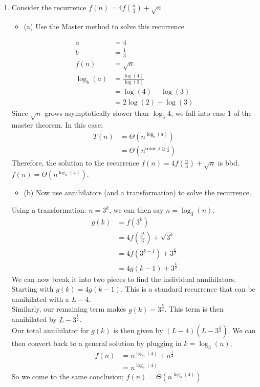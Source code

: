 \documentclass{article}
\begin{document}
\begin{enumerate}
\item Consider the recurrence $f(n) = 4f(\frac{n}{3}) + \sqrt{n}$
\begin{itemize}
    \item (a) Use the Master method to solve this recurrence
\end{itemize}
\begin{align*}
    a & = 4 \\
    b & = \frac{1}{3} \\
    f(n) & = \sqrt{n} \\
    \log_{b}(a) & = \frac{\log(4)}{\log(3)} \\
    & = \log(4) - \log(3) \\
    & = 2 \log(2) - \log(3)
\end{align*}
Since $\sqrt{n}$ grows asymptotically slower than $\log_{3}{4}$, we fall into case 1 of the master theorem. In this case: 
\begin{align*}
    T(n) & = \Theta(n^{\log_{b}(a)}) \\
    & = \Theta(n^{\text{some } j \geq \frac{1}{2}})
\end{align*}
Therefore, the solution to the recurrence $f(n) = 4f(\frac{n}{3}) + \sqrt{n}$ is bbd. $f(n) = \Theta(n^{\log_{3}(4)})$. \\
\newline 






\newpage
\begin{itemize}
    \item (b) Now use annihilators (and a transformation) to solve the recurrence. 
\end{itemize}
Using a transformation: $n = 3^{k}$, we can then say $n = \log_{3}(n)$. 
\begin{align*}
    g(k) & = f(3^{k}) \\
    & = 4f(\frac{3^{k}}{3}) + \sqrt{3^{k}} \\
    & = 4f(3^{k-1}) + 3^{\frac{k}{2}} \\
    & = 4g(k-1) + 3^{\frac{k}{2}}
\end{align*}
We can now break it into two pieces to find the individual annihilators. Starting with $g(k) = 4g(k-1)$. This is a standard recurrence that can be annihilated with a $L-4$.\\
\newline 
Similarly, our remaining term makes $g(k) = 3^{\frac{k}{2}}$. This term is then annihilated by $L - 3^{\frac{1}{2}}$. \\
\newline 
Our total annihilator for $g(k)$ is then given by $(L-4)(L - 3^{\frac{1}{2}})$. We can then convert back to a general solution by plugging in $k = \log_{3}(n)$, 
\begin{align*}
    f(n) & = n^{\log_{3}(4)} + n^{\frac{1}{2}} \\
    & = n^{\log_{3}(4)}
\end{align*}
So we come to the same conclusion; $f(n) = \Theta(n^{\log_{3}(4)})$
\newpage 







\end{enumerate}
\end{document}

